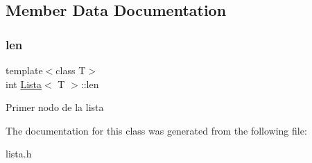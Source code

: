 \subsection{Member Data Documentation}
\mbox{\label{classLista_a091894d515b7cf5ce75cfec9d8f65dbe}} 
\subsubsection{\texorpdfstring{len}{len}}
{\footnotesize\ttfamily template$<$class T$>$ \\
int \hyperlink{classLista}{Lista}$<$ T $>$\+::len}

Primer nodo de la lista 

The documentation for this class was generated from the following file\+:\begin{DoxyCompactItemize}
\item 
lista.\+h\end{DoxyCompactItemize}
